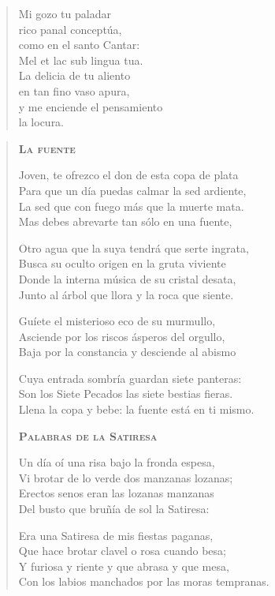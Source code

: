 \documentclass[12pt]{article}
\begin{document}
\begin{verse}
Mi gozo tu paladar\\
rico panal conceptúa,\\
como en el santo Cantar:\\
Mel et lac sub lingua tua.\\
La delicia de tu aliento\\
en tan fino vaso apura,\\
y me enciende el pensamiento\\
la locura.  

\end{verse}

\clearpage
{}
\begin{verse}

{\bfseries\scshape {La fuente}}

Joven, te ofrezco el don de esta copa de plata\\
Para que un día puedas calmar la sed ardiente,\\
La sed que con fuego más que la muerte mata.\\
Mas debes abrevarte tan sólo en una fuente,  

Otro agua que la suya tendrá que serte ingrata,\\
Busca su oculto origen en la gruta viviente\\
Donde la interna música de su cristal desata,\\
Junto al árbol que llora y la roca que siente.  

Guíete el misterioso eco de su murmullo,\\
Asciende por los riscos ásperos del orgullo,\\
Baja por la constancia y desciende al abismo  

Cuya entrada sombría guardan siete panteras:\\
Son los Siete Pecados las siete bestias fieras.\\
Llena la copa y bebe: la fuente está en ti mismo.  

{\bfseries\scshape {Palabras de la Satiresa}}

Un día oí una risa bajo la fronda espesa,\\
Vi brotar de lo verde dos manzanas lozanas;\\
Erectos senos eran las lozanas manzanas\\
Del busto que bruñía de sol la Satiresa:  

Era una Satiresa de mis fiestas paganas,\\
Que hace brotar clavel o rosa cuando besa;\\
Y furiosa y riente y que abrasa y que mesa,\\
Con los labios manchados por las moras tempranas.  


\end{verse}
\end{document}
